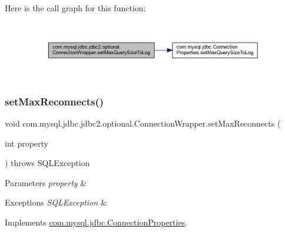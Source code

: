 Here is the call graph for this function\+:
\nopagebreak
\begin{figure}[H]
\begin{center}
\leavevmode
\includegraphics[width=350pt]{classcom_1_1mysql_1_1jdbc_1_1jdbc2_1_1optional_1_1_connection_wrapper_ac2fc5533a1f39ec379f5641cd048a91f_cgraph}
\end{center}
\end{figure}
\mbox{\label{classcom_1_1mysql_1_1jdbc_1_1jdbc2_1_1optional_1_1_connection_wrapper_aeed825d6bd8942b00610c43d8a8c82ef}} 
\subsubsection{\texorpdfstring{set\+Max\+Reconnects()}{setMaxReconnects()}}
{\footnotesize\ttfamily void com.\+mysql.\+jdbc.\+jdbc2.\+optional.\+Connection\+Wrapper.\+set\+Max\+Reconnects (\begin{DoxyParamCaption}\item[{int}]{property }\end{DoxyParamCaption}) throws S\+Q\+L\+Exception}


\begin{DoxyParams}{Parameters}
{\em property} & \\
\hline
\end{DoxyParams}

\begin{DoxyExceptions}{Exceptions}
{\em S\+Q\+L\+Exception} & \\
\hline
\end{DoxyExceptions}


Implements \mbox{\hyperlink{interfacecom_1_1mysql_1_1jdbc_1_1_connection_properties_aa4dbdf7b74fc014b67992de0cf9247c9}{com.\+mysql.\+jdbc.\+Connection\+Properties}}.


